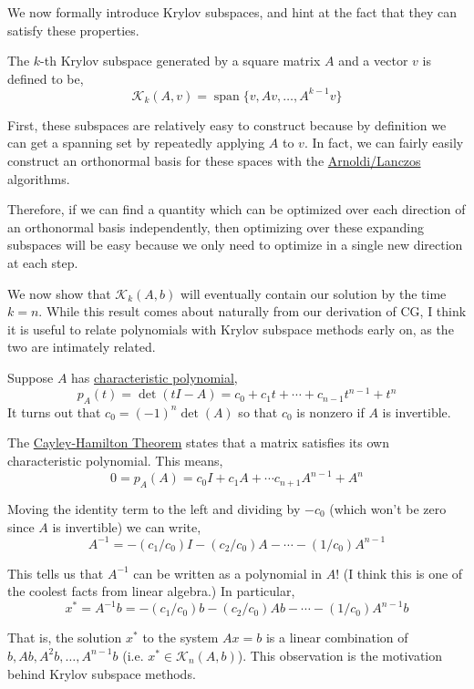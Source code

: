 \documentclass[10pt]{article}
\begin{document}
We now formally introduce Krylov subspaces, and hint at the fact that they can satisfy these properties.

The \(k\)-th Krylov subspace generated by a square matrix \(A\) and a vector \(v\) is defined to be,
\[
\mathcal{K}_k(A,v) = \operatorname{span}\{v,Av,\ldots,A^{k-1}v \}
\]

First, these subspaces are relatively easy to construct because by definition we can get a spanning set by repeatedly applying \(A\) to \(v\).
In fact, we can fairly easily construct an orthonormal basis for these spaces with the \href{./arnoldi_lanczos.html}{Arnoldi/Lanczos} algorithms.

Therefore, if we can find a quantity which can be optimized over each direction of an orthonormal basis independently, then optimizing over these expanding subspaces will be easy because we only need to optimize in a single new direction at each step.

We now show that \(\mathcal{K}_k(A,b)\) will eventually contain our solution by the time \(k=n\).
While this result comes about naturally from our derivation of CG, I think it is useful to relate polynomials with Krylov subspace methods early on, as the two are intimately related.

Suppose \(A\) has \href{https://en.wikipedia.org/wiki/Characteristic_polynomial\#Characteristic_equation}{characteristic polynomial},
\[
p_A(t) = \det(tI-A) = c_0 + c_1t + \cdots + c_{n-1}t^{n-1} + t^n
\]
It turns out that \(c_0 = (-1)^n\det(A)\) so that \(c_0\) is nonzero if \(A\) is invertible.

The \href{https://en.wikipedia.org/wiki/Cayley\%E2\%80\%93Hamilton_theorem}{Cayley-Hamilton Theorem} states that a matrix satisfies its own characteristic polynomial.
This means,
\[
0 = p_A(A) = c_0 I + c_1 A + \cdots c_{n+1} A^{n-1} + A^n
\]

Moving the identity term to the left and dividing by \(-c_0\) (which won't be zero since \(A\) is invertible) we can write,
\[
A^{-1} = -(c_1/c_0) I - (c_2/c_0) A - \cdots - (1/c_0) A^{n-1}
\]

This tells us that \(A^{-1}\) can be written as a polynomial in \(A\)! (I think this is one of the coolest facts from linear algebra.) In particular,\\
\[
x^* = A^{-1}b = -(c_1/c_0) b - (c_2/c_0) Ab - \cdots - (1/c_0) A^{n-1}b
\]

That is, the solution \(x^*\) to the system \(Ax = b\) is a linear combination of \(b, Ab, A^2b, \ldots, A^{n-1}b\) (i.e. \(x^*\in\mathcal{K}_n(A,b)\)).
This observation is the motivation behind Krylov subspace methods.
\end{document}

